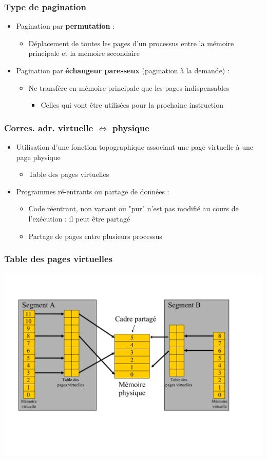\begin{frame}
\frametitle{Type de pagination}
\begin{itemize}
\item Pagination par \textbf{permutation} :
\begin{itemize}
\item Déplacement de toutes les pages d'un processus entre la mémoire principale et la mémoire secondaire
\end{itemize}
\item Pagination par \textbf{échangeur paresseux} (pagination à la demande) :
\begin{itemize}
\item Ne transfère en mémoire principale que les pages indispensables
\begin{itemize}
\item Celles qui vont être utilisées pour la prochaine instruction
\end{itemize}
\end{itemize}
\end{itemize}
\end{frame}


\begin{frame}
\frametitle{Corres. adr. virtuelle  $\Leftrightarrow$  physique}
\begin{itemize}
\item Utilisation d'une fonction topographique associant une page virtuelle à une page physique 
\begin{itemize}
\item Table des pages virtuelles
\end{itemize}
\item Programmes ré-entrants ou partage de données :
\begin{itemize}
\item Code réentrant, non variant ou "pur" n'est pas modifié au cours de l'exécution : il peut être partagé
\item Partage de pages entre plusieurs processus
\end{itemize}
\end{itemize}
\end{frame}


\begin{frame}
\frametitle{Table des pages virtuelles}
\includegraphics[width=.9\textwidth]{../illustration/table_pages_virtuelles.pdf}
\end{frame}


